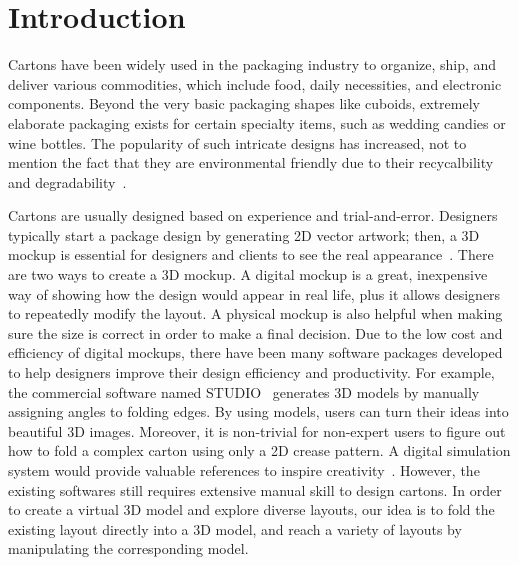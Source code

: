\section{Introduction}

Cartons have been widely used in the packaging industry to organize, ship, and deliver various commodities, which include food, daily necessities, and electronic components. 
Beyond the very basic packaging shapes like cuboids, extremely elaborate packaging exists for certain specialty items, such as wedding candies or wine bottles. 
The popularity of such intricate designs has increased, not to mention the fact that they are environmental friendly due to their recycalbility and degradability~\cite{Mullineux:2010:CSC:1739328.1739673}.

Cartons are usually designed based on experience and trial-and-error.
Designers typically start a package design by generating 2D vector artwork; then, a 3D mockup is essential for designers and clients to see the real appearance~\cite{guide}. There are two ways to create a 3D mockup.
A digital mockup is a great, inexpensive way of showing how the design would appear in real life, plus it allows designers to repeatedly modify the layout.
A physical mockup is also helpful when making sure the size is correct in order to make a final decision. 
%
Due to the low cost and efficiency of digital mockups, there have been many software packages developed to help designers improve their design efficiency and productivity.
%
For example, the commercial software named STUDIO~\cite{STUDIO} generates 3D models by manually assigning angles to folding edges. 
By using models, users can turn their ideas into beautiful 3D images.
Moreover, it is non-trivial for non-expert users to figure out how to fold a complex carton using only a 2D crease pattern. A digital simulation system would provide valuable references to inspire creativity~\cite{Thiel1998,Kishi:1998:OFP:786112.786279,Nimnual2007Virtual}. 
However, the existing softwares still requires extensive manual skill to design cartons.
In order to create a virtual 3D model and explore diverse layouts, our idea is to fold the existing layout directly into a 3D model, and reach a variety of layouts by manipulating the corresponding model.


